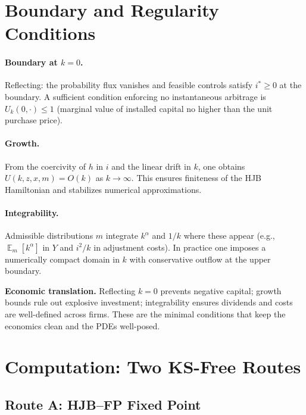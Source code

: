 \documentclass[11pt,letterpaper,oneside]{article}
\numberwithin{equation}{section}
\newcommand{\ac}[1]{{\mdseries\textsc{#1}}}
\DeclareMathOperator{\E}{\mathbb{E}}
\newcommand{\1}{\mathbf{1}}
\begin{document}
\section{Boundary and Regularity Conditions}

\paragraph{Boundary at $k=0$.} Reflecting: the probability flux vanishes and feasible controls satisfy $i^*\ge 0$ at the boundary. A sufficient condition enforcing no instantaneous arbitrage is $U_k(0,\cdot)\le 1$ (marginal value of installed capital no higher than the unit purchase price).

\paragraph{Growth.} From the coercivity of $h$ in $i$ and the linear drift in $k$, one obtains $U(k,z,x,m)=O(k)$ as $k\to\infty$. This ensures finiteness of the HJB Hamiltonian and stabilizes numerical approximations.

\paragraph{Integrability.} Admissible distributions $m$ integrate $k^\alpha$ and $1/k$ where these appear (e.g., $\E_m[k^\alpha]$ in $Y$ and $i^2/k$ in adjustment costs). In practice one imposes a numerically compact domain in $k$ with conservative outflow at the upper boundary.

\begin{tcolorbox}[didacticstyle]
\textbf{Economic translation.} Reflecting $k=0$ prevents negative capital; growth bounds rule out explosive investment; integrability ensures dividends and costs are well-defined across firms. These are the minimal conditions that keep the economics clean and the PDEs well-posed.
\end{tcolorbox}

\section{Computation: Two KS-Free Routes}

\subsection{Route A: \ac{HJB}--\ac{FP} Fixed Point}\label{sec:routeA}
\end{document}
